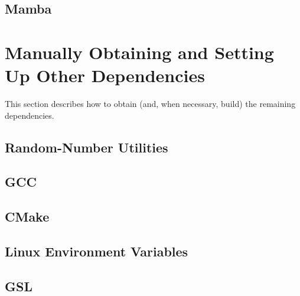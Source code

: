 \documentclass[11pt]{article}
\begin{document}
\subsection{Mamba}
\label{sec:mamba}



\section{Manually Obtaining and Setting Up Other Dependencies}
\label{sec:manually_obtaining_dependencies}

This section describes how to obtain (and, when necessary, build) the remaining dependencies.

\subsection{Random-Number Utilities}
\label{sec:randutils}



\subsection{GCC}
\label{sec:gcc}



\subsection{CMake}
\label{sec:cmake}



\subsection{Linux Environment Variables}
\label{sec:linux_environment}



\subsection{GSL}
\label{sec:gsl}
\end{document}
